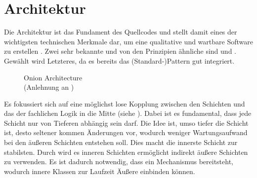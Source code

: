 \section{Architektur}\label{sec:architektur}

Die Architektur ist das Fundament des Quellcodes und stellt damit eines der wichtigsten technischen Merkmale dar, um eine qualitative und wartbare Software zu erstellen .
Zwei sehr bekannte und von den Prinzipien ähnliche sind   und  .
Gewählt wird Letzteres, da es bereits das (Standard-)Pattern   gut integriert.

\begin{figure}%
    \centering
    \caption{Onion Architecture\\(Anlehnung an )}\label{fig:onion-architecture}
    \vspace{1em}
\end{figure}%
%


Es fokussiert sich auf eine möglichst lose Kopplung zwischen den Schichten und das  der fachlichen Logik in die Mitte (siehe ).
Dabei ist es fundamental, dass jede Schicht nur von Tieferen abhängig sein darf.
Die Idee ist, umso tiefer die Schicht ist, desto seltener kommen Änderungen vor, wodurch weniger Wartungsaufwand bei den äußeren Schichten entstehen soll.
Dies macht die innerste Schicht  zur stabilsten.
Durch  wird es inneren Schichten ermöglicht indirekt äußere Schichten zu verwenden.
Es ist dadurch notwendig, dass ein Mechanismus bereitsteht, wodurch innere Klassen zur Laufzeit Äußere einbinden können. 

